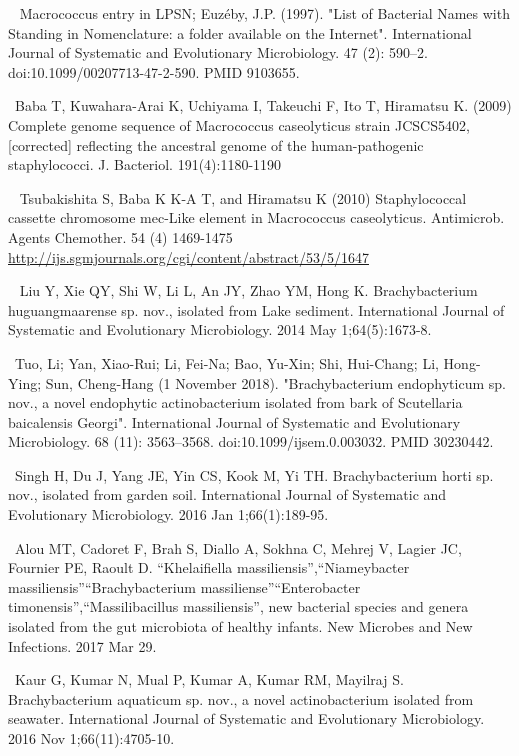\documentclass[11pt]{article}
\begin{document}
\begin{thebibliography}{3}
	~ Macrococcus entry in LPSN; Euzéby, J.P. (1997). "List of Bacterial Names with Standing in Nomenclature: a folder available on the Internet". International Journal of Systematic and Evolutionary Microbiology. 47 (2): 590–2. doi:10.1099/00207713-47-2-590. PMID 9103655.
	
	~Baba T, Kuwahara-Arai K, Uchiyama I, Takeuchi F, Ito T, Hiramatsu K. (2009) Complete genome sequence of Macrococcus caseolyticus strain JCSCS5402, [corrected] reflecting the ancestral genome of the human-pathogenic staphylococci. J. Bacteriol. 191(4):1180-1190
	
	~ Tsubakishita S, Baba K K-A T, and Hiramatsu K (2010) Staphylococcal cassette chromosome mec-Like element in Macrococcus caseolyticus. Antimicrob. Agents Chemother. 54 (4) 1469-1475
	~ ~\url{ http://ijs.sgmjournals.org/cgi/content/abstract/53/5/1647}
	
	~ Liu Y, Xie QY, Shi W, Li L, An JY, Zhao YM, Hong K. Brachybacterium huguangmaarense sp. nov., isolated from Lake sediment. International Journal of Systematic and Evolutionary Microbiology. 2014 May 1;64(5):1673-8.
	
	~Tuo, Li; Yan, Xiao-Rui; Li, Fei-Na; Bao, Yu-Xin; Shi, Hui-Chang; Li, Hong-Ying; Sun, Cheng-Hang (1 November 2018). "Brachybacterium endophyticum sp. nov., a novel endophytic actinobacterium isolated from bark of Scutellaria baicalensis Georgi". International Journal of Systematic and Evolutionary Microbiology. 68 (11): 3563–3568. doi:10.1099/ijsem.0.003032. PMID 30230442.
	
	~Singh H, Du J, Yang JE, Yin CS, Kook M, Yi TH. Brachybacterium horti sp. nov., isolated from garden soil. International Journal of Systematic and Evolutionary Microbiology. 2016 Jan 1;66(1):189-95.

	~Alou MT, Cadoret F, Brah S, Diallo A, Sokhna C, Mehrej V, Lagier JC, Fournier PE, Raoult D. “Khelaifiella massiliensis”,“Niameybacter massiliensis”“Brachybacterium massiliense”“Enterobacter timonensis”,“Massilibacillus massiliensis”, new bacterial species and genera isolated from the gut microbiota of healthy infants. New Microbes and New Infections. 2017 Mar 29.
	
	~Kaur G, Kumar N, Mual P, Kumar A, Kumar RM, Mayilraj S. Brachybacterium aquaticum sp. nov., a novel actinobacterium isolated from seawater. International Journal of Systematic and Evolutionary Microbiology. 2016 Nov 1;66(11):4705-10.
	

\end{thebibliography}
\end{document}
